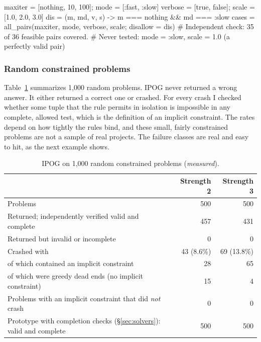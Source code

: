 \documentclass[11pt]{article}
\newcommand{\code}[1]{\texttt{\detokenize{#1}}}
\begin{document}
\begin{jlcode}
maxiter = [nothing, 10, 100]; mode = [:fast, :slow]
verbose = [true, false];      scale = [1.0, 2.0, 3.0]
dis = (m, md, v, s) -> m === nothing && md === :slow
cases = all_pairs(maxiter, mode, verbose, scale; disallow = dis)
# Independent check: 35 of 36 feasible pairs covered.
# Never tested: mode = :slow, scale = 1.0   (a perfectly valid pair)
\end{jlcode}

\subsubsection*{Random constrained problems}

Table~\ref{tab:random} summarizes 1,000 random problems. IPOG never
returned a wrong answer. It either returned a correct one or crashed. For
every crash I checked whether some tuple that the rule permits in isolation
is impossible in any complete, allowed test, which is the definition of an
implicit constraint. The rates depend on how tightly the rules bind, and
these small, fairly constrained problems are not a sample of real projects.
The failure classes are real and easy to hit, as the next example shows.

\begin{table}[h]
\centering\small
\caption{IPOG on 1,000 random constrained problems (\emph{measured}).}\label{tab:random}
\begin{tabular}{@{}lrr@{}}
\toprule
 & Strength 2 & Strength 3 \\
\midrule
Problems & 500 & 500 \\
Returned; independently verified valid and complete & 457 & 431 \\
Returned but invalid or incomplete & 0 & 0 \\
Crashed with \code{BoundsError} & 43 (8.6\%) & 69 (13.8\%) \\
\quad of which contained an implicit constraint & 28 & 65 \\
\quad of which were greedy dead ends (no implicit constraint) & 15 & 4 \\
Problems with an implicit constraint that did \emph{not} crash & 0 & 0 \\
\midrule
Prototype with completion checks (\S\ref{sec:solvers}): valid and complete & 500 & 500 \\
\bottomrule
\end{tabular}
\end{table}
\end{document}
